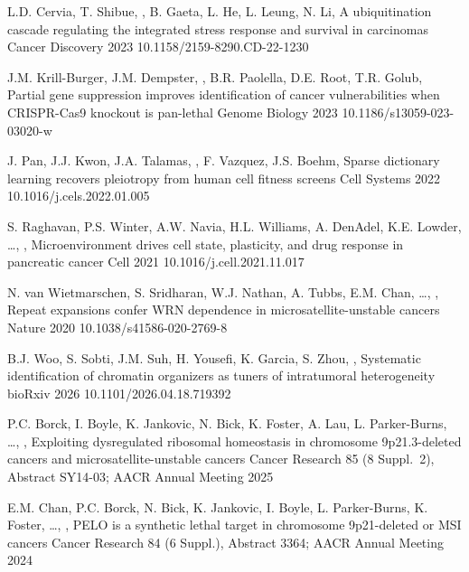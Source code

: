   \pub
    {L.D. Cervia, T. Shibue, \me, B. Gaeta, L. He, L. Leung, N. Li, \etal}
    {A ubiquitination cascade regulating the integrated stress response and survival in carcinomas}
    {Cancer Discovery}
    {2023}
    {10.1158/2159-8290.CD-22-1230}

  \pub
    {J.M. Krill-Burger, J.M. Dempster, \me, B.R. Paolella, D.E. Root, T.R. Golub, \etal}
    {Partial gene suppression improves identification of cancer vulnerabilities when CRISPR-Cas9 knockout is pan-lethal}
    {Genome Biology}
    {2023}
    {10.1186/s13059-023-03020-w}

  \pub
    {J. Pan, J.J. Kwon, J.A. Talamas, \me, F. Vazquez, J.S. Boehm, \etal}
    {Sparse dictionary learning recovers pleiotropy from human cell fitness screens}
    {Cell Systems}
    {2022}
    {10.1016/j.cels.2022.01.005}

  \pub
    {S. Raghavan, P.S. Winter, A.W. Navia, H.L. Williams, A. DenAdel, K.E. Lowder, \ldots, \me, \etal}
    {Microenvironment drives cell state, plasticity, and drug response in pancreatic cancer}
    {Cell}
    {2021}
    {10.1016/j.cell.2021.11.017}

  \pub
    {N. van Wietmarschen, S. Sridharan, W.J. Nathan, A. Tubbs, E.M. Chan, \ldots, \me, \etal}
    {Repeat expansions confer WRN dependence in microsatellite-unstable cancers}
    {Nature}
    {2020}
    {10.1038/s41586-020-2769-8}

\sectionListEnd

\sectionList

  \pub
    {B.J. Woo, S. Sobti, J.M. Suh, H. Yousefi, K. Garcia, S. Zhou, \me, \etal}
    {Systematic identification of chromatin organizers as tuners of intratumoral heterogeneity}
    {bioRxiv}
    {2026}
    {10.1101/2026.04.18.719392}

\sectionListEnd

\sectionList

  \abstr
    {P.C. Borck, I. Boyle, K. Jankovic, N. Bick, K. Foster, A. Lau, L. Parker-Burns, \ldots, \me, \etal}
    {Exploiting dysregulated ribosomal homeostasis in chromosome 9p21.3-deleted cancers and microsatellite-unstable cancers}
    {Cancer Research 85 (8 Suppl.\ 2), Abstract SY14-03; AACR Annual Meeting}
    {2025}

  \abstr
    {E.M. Chan, P.C. Borck, N. Bick, K. Jankovic, I. Boyle, L. Parker-Burns, K. Foster, \ldots, \me, \etal}
    {PELO is a synthetic lethal target in chromosome 9p21-deleted or MSI cancers}
    {Cancer Research 84 (6 Suppl.), Abstract 3364; AACR Annual Meeting}
    {2024}

